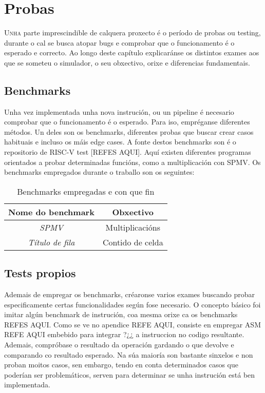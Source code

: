 \chapter{Probas}
\label{chap:probas}

\lettrine{U}{nha} parte imprescindible de calquera proxecto é o período de probas ou testing, durante o cal se busca atopar bugs e comprobar que o funcionamento é o esperado e correcto. Ao longo deste capítulo explicaránse os distintos exames aos que se someteu o simulador, o seu obxectivo, orixe e diferencias fundamentais.

\section{Benchmarks}\label{sec:benchmarks}
Unha vez implementada unha nova instrución, ou un pipeline é necesario comprobar que o funcionamento é o esperado. Para iso, empréganse diferentes métodos. Un deles son os benchmarks, diferentes probas que buscar crear casos habituais e incluso os máis edge cases. A fonte destos benchmarks son  é o repositorio de RISC-V test [REFES AQUI]. Aquí existen diferentes programas orientados a probar determinadas funcións, como a multiplicación con SPMV. Os benchmarks empregados durante o traballo son os seguintes:
\begin{table}[hp!]
  \centering
  \begin{tabular}{c|c}
    \rowcolor{udcpink!25}
    \textbf{Nome do benchmark} & \textbf{Obxectivo} \\\hline
    \textit{SPMV} & Multiplicacións \\
    \textit{Título de fila} & Contido de celda \\
  \end{tabular}
  \caption{Benchmarks empregadas e con que fin}
  \label{tab:benchmarks}
\end{table}

\section{Tests propios}\label{sec:tests}
Ademais de empregar os benchmarks, créaronse varios exames buscando probar especificamente certas funcionalidades según fose necesario. O concepto básico foi imitar algún benchmark de instrución, coa mesma orixe ca os benchmarks REFES AQUI. Como se ve no apendice REFE AQUI, consiste en empregar ASM REFE AQUI embebido para integrar ?¿¿ a instruccion no codigo resultante. Ademais, compróbase o resultado da operación gardando o que devolve e comparando co resultado esperado. Na súa maioría son bastante sinxelos e non proban moitos casos, sen embargo, tendo en conta determinados casos que poderían ser problemáticos, serven para determinar se unha instrución está ben implementada.


